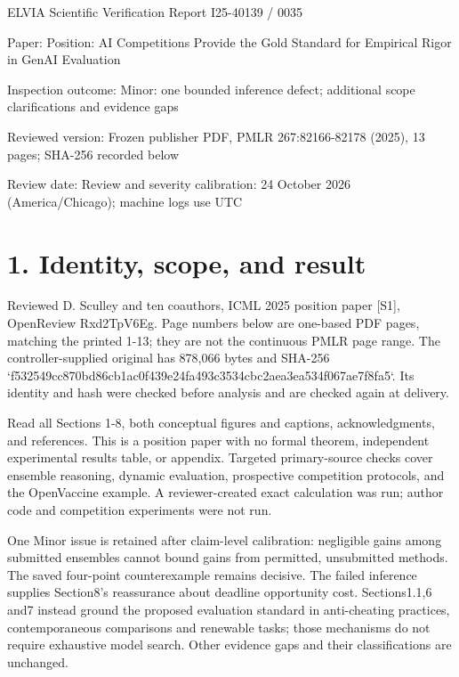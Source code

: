 \documentclass[10pt]{article}
\begin{document}
ELVIA Scientific Verification Report
I25-40139 / 0035\par
Paper: Position: AI Competitions Provide the Gold Standard for Empirical Rigor in GenAI Evaluation\par
Inspection outcome: Minor: one bounded inference defect; additional scope clarifications and evidence gaps\par
Reviewed version: Frozen publisher PDF, PMLR 267:82166-82178 (2025), 13 pages; SHA-256 recorded below\par
Review date: Review and severity calibration: 24 October 2026 (America/Chicago); machine logs use UTC\par
\section*{1. Identity, scope, and result}
Reviewed D. Sculley and ten coauthors, ICML 2025 position paper [S1], OpenReview Rxd2TpV6Eg. Page numbers below are one-based PDF pages, matching the printed 1-13; they are not the continuous PMLR page range. The controller-supplied original has 878,066 bytes and SHA-256 `f532549cc870bd86cb1ac0f439e24fa493c3534cbc2aea3ea534f067ae7f8fa5`. Its identity and hash were checked before analysis and are checked again at delivery.\par
Read all Sections 1-8, both conceptual figures and captions, acknowledgments, and references. This is a position paper with no formal theorem, independent experimental results table, or appendix. Targeted primary-source checks cover ensemble reasoning, dynamic evaluation, prospective competition protocols, and the OpenVaccine example. A reviewer-created exact calculation was run; author code and competition experiments were not run.\par
One Minor issue is retained after claim-level calibration: negligible gains among submitted ensembles cannot bound gains from permitted, unsubmitted methods. The saved four-point counterexample remains decisive. The failed inference supplies Section8’s reassurance about deadline opportunity cost. Sections1.1,6 and7 instead ground the proposed evaluation standard in anti-cheating practices, contemporaneous comparisons and renewable tasks; those mechanisms do not require exhaustive model search. Other evidence gaps and their classifications are unchanged.\par
\end{document}
